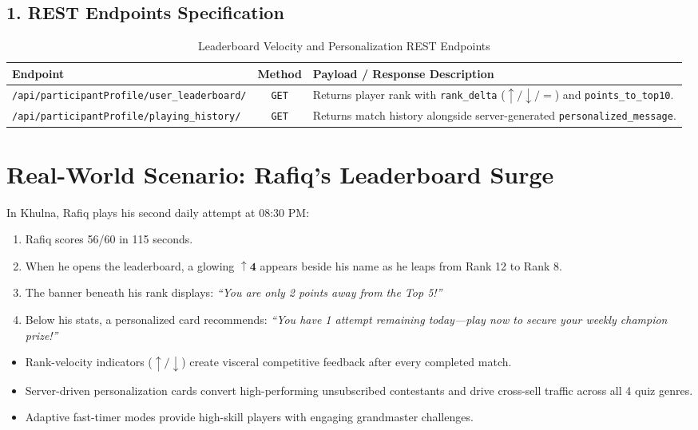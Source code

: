 \subsection{1. REST Endpoints Specification}
\begin{table}[htbp]
\centering
\small
\begin{tabular}{|p{6.2cm}|c|p{7.5cm}|}
\hline
\rowcolor{primaryBlue!15}
\textbf{Endpoint} & \textbf{Method} & \textbf{Payload / Response Description} \\ \hline
\texttt{/api/participantProfile/}\newline\texttt{user\_leaderboard/} & \texttt{GET} & Returns player rank with \texttt{rank\_delta} ($\uparrow/\downarrow/=$) and \texttt{points\_to\_top10}. \\ \hline
\texttt{/api/participantProfile/}\newline\texttt{playing\_history/} & \texttt{GET} & Returns match history alongside server-generated \texttt{personalized\_message}. \\ \hline
\end{tabular}
\caption{Leaderboard Velocity and Personalization REST Endpoints}
\end{table}

\section{Real-World Scenario: Rafiq's Leaderboard Surge}
In Khulna, Rafiq plays his second daily attempt at 08:30 PM:

\begin{enumerate}
    \item Rafiq scores 56/60 in 115 seconds.
    \item When he opens the leaderboard, a glowing $\boldsymbol{\uparrow 4}$ appears beside his name as he leaps from Rank 12 to Rank 8.
    \item The banner beneath his rank displays: \textit{``You are only 2 points away from the Top 5!''}
    \item Below his stats, a personalized card recommends: \textit{``You have 1 attempt remaining today—play now to secure your weekly champion prize!''}
\end{enumerate}

\begin{tcolorbox}[summarybox, title={Chapter Key Takeaways}]
\begin{itemize}
    \item Rank-velocity indicators ($\uparrow/\downarrow$) create visceral competitive feedback after every completed match.
    \item Server-driven personalization cards convert high-performing unsubscribed contestants and drive cross-sell traffic across all 4 quiz genres.
    \item Adaptive fast-timer modes provide high-skill players with engaging grandmaster challenges.
\end{itemize}
\end{tcolorbox}
